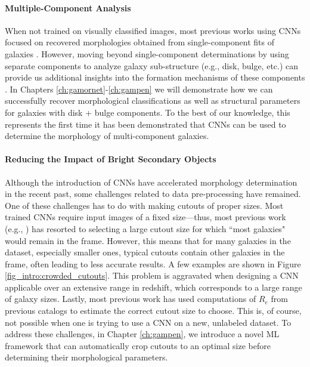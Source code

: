 \paragraph{Multiple-Component Analysis} When not trained on visually classified images, most previous works using CNNs focused on recovered morphologies obtained from single-component \sersic{} fits of galaxies \citep[e.g.,][]{Tuccillo2018DeepFitting}. However, moving beyond single-component determinations by using separate components to analyze galaxy sub-structure (e.g., disk, bulge, etc.) can provide us additional insights into the formation mechanisms of these components \citep[e.g.,][]{kormendy_1979,kormendy_2004, genzel_2008, sellwood_2014}. In Chapters \ref{ch:gamornet}-\ref{ch:gampen} we will demonstrate how we can successfully recover morphological classifications as well as structural parameters for galaxies with disk + bulge components. To the best of our knowledge, this represents the first time it has been demonstrated that CNNs can be used to determine the morphology of multi-component galaxies.

\paragraph{Reducing the Impact of Bright Secondary Objects} Although the introduction of CNNs have accelerated morphology determination in the recent past, some challenges related to data pre-processing have remained. One of these challenges has to do with making cutouts of proper sizes. Most trained CNNs require input images of a fixed size---thus, most previous work (e.g., \citealp{Cheng2021GalaxyNetworks, Vega-Ferrero2021PushingSurvey}) has resorted to selecting a large cutout size for which ``most galaxies" would remain in the frame. However, this means that for many galaxies in the dataset, especially smaller ones, typical cutouts contain other galaxies in the frame, often leading to less accurate results. A few examples are shown in Figure \ref{fig_intro:crowded_cutouts}. This problem is aggravated when designing a CNN applicable over an extensive range in redshift, which corresponds to a large range of galaxy sizes. Lastly, most previous work has used computations of $R_e$ from previous catalogs to estimate the correct cutout size to choose. This is, of course, not possible when one is trying to use a CNN on a new, unlabeled dataset. To address these challenges, in Chapter \ref{ch:gampen}, we introduce a novel ML framework that can automatically crop cutouts to an optimal size before determining their morphological parameters. 

